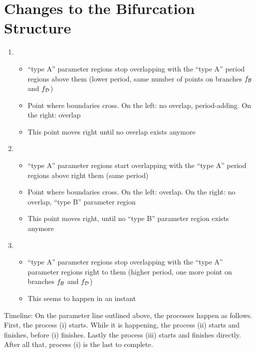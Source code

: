 \section{Changes to the Bifurcation Structure}
\label{sec:add.change}

\begin{enumerate}
	\item \begin{itemize}
		      \item ``type A'' parameter regions stop overlapping with the ``type A'' period regions above them (lower period, same number of points on branches $f_{\mathcal{B}}$ and $f_{\mathcal{D}}$)
		      \item Point where boundaries cross. On the left: no overlap, period-adding. On the right: overlap
		      \item This point moves right until no overlap exists anymore
	      \end{itemize}
	\item \begin{itemize}
		      \item ``type A'' parameter regions start overlapping with the ``type A'' period regions above right them (same period)
		      \item Point where boundaries cross. On the left: overlap. On the right: no overlap, ``type B'' parameter region
		      \item This point moves right, until no ``type B'' parameter region exists anymore
	      \end{itemize}
	\item \begin{itemize}
		      \item ``type A'' parameter regions stop overlapping with the ``type A'' parameter regions right to them (higher period, one more point on branches $f_{\mathcal{B}}$ and $f_{\mathcal{D}}$)
		      \item This seems to happen in an instant
	      \end{itemize}
\end{enumerate}

Timeline:
On the parameter line outlined above, the processes happen as follows.
First, the process (i) starts.
While it is happening, the process (ii) starts and finishes, before (i) finishes.
Lastly the process (iii) starts and finishes directly.
After all that, process (i) is the last to complete.


